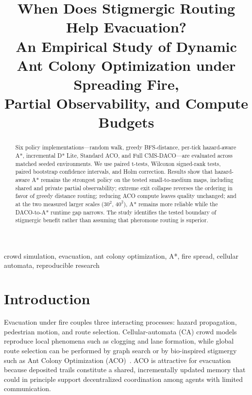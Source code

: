 ﻿\documentclass[conference]{IEEEtran}
\begin{document}
\title{When Does Stigmergic Routing Help Evacuation?\\[2pt]
\large An Empirical Study of Dynamic Ant Colony Optimization under Spreading Fire,\\
Partial Observability, and Compute Budgets}

\author{ %
}

\maketitle

\begin{abstract}
Six policy implementations---random walk, greedy BFS-distance, per-tick hazard-aware A*, incremental D* Lite, Standard ACO, and Full CMS-DACO---are evaluated across matched seeded environments. We use paired t-tests, Wilcoxon signed-rank tests, paired bootstrap confidence intervals, and Holm correction. Results show that hazard-aware A* remains the strongest policy on the tested small-to-medium maps, including shared and private partial observability; extreme exit collapse reverses the ordering in favor of greedy distance routing; reducing ACO compute leaves quality unchanged; and at the two measured larger scales ($30^2$, $40^2$), A* remains more reliable while the DACO-to-A* runtime gap narrows. The study identifies the tested boundary of stigmergic benefit rather than assuming that pheromone routing is superior.
\end{abstract}

\begin{IEEEkeywords}
crowd simulation, evacuation, ant colony optimization, A*, fire spread, cellular automata, reproducible research
\end{IEEEkeywords}

\section{Introduction}
Evacuation under fire couples three interacting processes: hazard propagation, pedestrian motion, and route selection. Cellular-automata (CA) crowd models reproduce local phenomena such as clogging and lane formation, while global route selection can be performed by graph search or by bio-inspired stigmergy such as Ant Colony Optimization (ACO)~\cite{dorigo2004}. ACO is attractive for evacuation because deposited trails constitute a shared, incrementally updated memory that could in principle support decentralized coordination among agents with limited communication.
\end{document}
